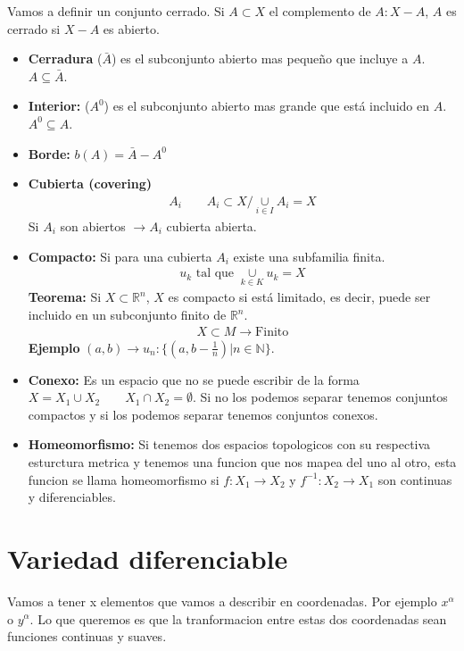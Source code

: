 \documentclass{article}
\begin{document}
Vamos a definir un conjunto cerrado. Si $ A \subset X  $ el complemento de $ A: X-A  $, $ A  $ es cerrado si $ X-A  $ es abierto.
\begin{itemize}

  \item\textbf{Cerradura } ($ \bar A  $) es el subconjunto abierto mas pequeño que incluye a $ A  $. $ A \subseteq \bar A  $.

  \item\textbf{Interior: } ($ A ^ {0 } $) es el subconjunto abierto mas grande que está incluido en $ A  $. $ A ^ {0 } \subseteq A $.

  \item \textbf{Borde: } $ b(A) = \bar A- A ^ {0 } $
  \item \textbf{Cubierta (covering)}
    \begin{gather*}
      {A_i } \qquad A_i \subset X / \underset{i\in I }{\cup }A_i = X  
    \end{gather*}
    Si $ A_i  $ son abiertos $ \rightarrow  {A_i } $ cubierta abierta.
  \item \textbf{Compacto:} Si para una cubierta $ {A_i } $ existe una subfamilia finita. 
    \begin{gather*}
      u_k \text{ tal que }\underset{k\in K }{\cup } u_k = X 
    \end{gather*}
    \textbf{Teorema: } Si $ X \subset \mathbb{R}^ {n } $, $ X  $ es compacto si está limitado, es decir, puede ser incluido en un subconjunto finito de $ \mathbb{R}^ {n } $.
    \begin{gather*}
      X \subset M \rightarrow \text{Finito}
    \end{gather*}
    \textbf{Ejemplo } $ (a,b) \rightarrow u_n : \{(a,b-\frac{1 }{n }) | n \in \mathbb{N}\} $.
  \item  \textbf{Conexo: } Es un espacio que no se puede escribir de la forma $ X = X_1 \cup X_2  \qquad X_1 \cap X_2 = \emptyset $. Si no los podemos separar tenemos conjuntos compactos y si los podemos separar tenemos conjuntos conexos.
  \item \textbf{Homeomorfismo: } Si tenemos dos espacios topologicos con su respectiva esturctura metrica y tenemos una funcion que nos mapea del uno al otro, esta funcion se llama homeomorfismo si $ f: X_1 \rightarrow X_2  $ y $ f ^ {-1 }: X_2 \rightarrow X_1  $ son continuas y diferenciables.
\end{itemize}

\section{Variedad diferenciable }
Vamos a tener x elementos que vamos a describir en coordenadas. Por ejemplo $ x ^ {\alpha } $ o $ y ^ {\alpha} $. Lo que queremos es que la tranformacion entre estas dos coordenadas sean funciones continuas y suaves.
\end{document}

